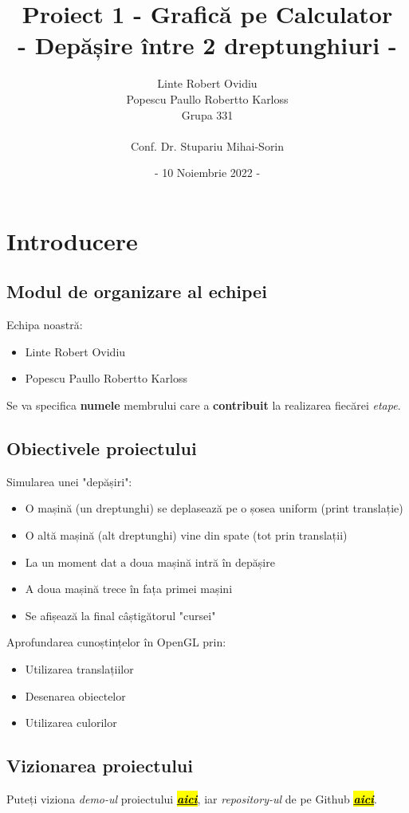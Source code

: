 \documentclass[12pt]{report}
\title{Proiect 1 - Grafică pe Calculator\\
\Large - Depășire între 2 dreptunghiuri -}
\date{- 10 Noiembrie 2022 -}
\author{Linte Robert Ovidiu\\ Popescu Paullo Robertto Karloss\\
\large Grupa 331\\\\
\large Conf. Dr. Stupariu Mihai-Sorin
}
\begin{document}
    \maketitle
    \tableofcontents
    \chapter{Introducere}
    \section{Modul de organizare al echipei}
    Echipa noastră:
    \begin{itemize}
        \item Linte Robert Ovidiu
        \item Popescu Paullo Robertto Karloss
    \end{itemize}
    Se va specifica \textbf{numele} membrului care a \textbf{contribuit} la realizarea fiecărei \emph{etape}.
    \section{Obiectivele proiectului}
    Simularea unei "depășiri":
    \begin{itemize}
        \item O mașină (un dreptunghi) se deplasează pe o șosea uniform (print translație)
        \item O altă mașină (alt dreptunghi) vine din spate (tot prin translații)
        \item La un moment dat a doua mașină intră în depășire
        \item A doua mașină trece în fața primei mașini
        \item Se afișează la final câștigătorul "cursei"
    \end{itemize}
    Aprofundarea cunoștințelor în OpenGL prin:
    \begin{itemize}
        \item Utilizarea translațiilor
        \item Desenarea obiectelor
        \item Utilizarea culorilor
    \end{itemize}

    \section{Vizionarea proiectului}
    Puteți viziona \emph{demo-ul} proiectului \href{https://youtu.be/itgOAlJtbVY}{\textbf{\textit{\hl{aici}}}}, iar \emph{repository-ul} de pe Github \href{https://github.com/linterobert/Proiect-Grafica}{\textbf{\textit{\hl{aici}}}}.
\end{document}
